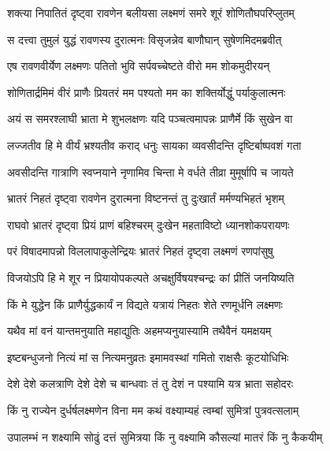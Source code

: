 
\twolineshloka
{शक्त्या निपातितं दृष्ट्वा रावणेन बलीयसा}
{लक्ष्मणं समरे शूरं शोणितौघपरिप्लुतम्} %

\twolineshloka
{स दत्त्वा तुमुलं युद्धं रावणस्य दुरात्मनः}
{विसृजन्नेव बाणौघान् सुषेणमिदमब्रवीत्} %

\twolineshloka
{एष रावणवीर्येण लक्ष्मणः पतितो भुवि}
{सर्पवच्चेष्टते वीरो मम शोकमुदीरयन्} %

\twolineshloka
{शोणितार्द्रमिमं वीरं प्राणैः प्रियतरं मम}
{पश्यतो मम का शक्तिर्योद्धुं पर्याकुलात्मनः} %

\twolineshloka
{अयं स समरश्लाघी भ्राता मे शुभलक्षणः}
{यदि पञ्चत्वमापन्नः प्राणैर्मे किं सुखेन वा} %

\twolineshloka
{लज्जतीव हि मे वीर्यं भ्रश्यतीव कराद् धनुः}
{सायका व्यवसीदन्ति दृष्टिर्बाष्पवशं गता} %

\twolineshloka
{अवसीदन्ति गात्राणि स्वप्नयाने नृणामिव}
{चिन्ता मे वर्धते तीव्रा मुमूर्षापि च जायते} %

\twolineshloka
{भ्रातरं निहतं दृष्ट्वा रावणेन दुरात्मना}
{विष्टनन्तं तु दुःखार्तं मर्मण्यभिहतं भृशम्} %

\twolineshloka
{राघवो भ्रातरं दृष्ट्वा प्रियं प्राणं बहिश्चरम्}
{दुःखेन महताविष्टो ध्यानशोकपरायणः} %

\twolineshloka
{परं विषादमापन्नो विललापाकुलेन्द्रियः}
{भ्रातरं निहतं दृष्ट्वा लक्ष्मणं रणपांसुषु} %

\twolineshloka
{विजयोऽपि हि मे शूर न प्रियायोपकल्पते}
{अचक्षुर्विषयश्चन्द्रः कां प्रीतिं जनयिष्यति} %

\twolineshloka
{किं मे युद्धेन किं प्राणैर्युद्धकार्यं न विद्यते}
{यत्रायं निहतः शेते रणमूर्धनि लक्ष्मणः} %

\twolineshloka
{यथैव मां वनं यान्तमनुयाति महाद्युतिः}
{अहमप्यनुयास्यामि तथैवैनं यमक्षयम्} %

\twolineshloka
{इष्टबन्धुजनो नित्यं मां स नित्यमनुव्रतः}
{इमामवस्थां गमितो राक्षसैः कूटयोधिभिः} %

\twolineshloka
{देशे देशे कलत्राणि देशे देशे च बान्धवाः}
{तं तु देशं न पश्यामि यत्र भ्राता सहोदरः} %

\twolineshloka
{किं नु राज्येन दुर्धर्षलक्ष्मणेन विना मम}
{कथं वक्ष्याम्यहं त्वम्बां सुमित्रां पुत्रवत्सलाम्} %

\twolineshloka
{उपालम्भं न शक्ष्यामि सोढुं दत्तं सुमित्रया}
{किं नु वक्ष्यामि कौसल्यां मातरं किं नु कैकयीम्} %

